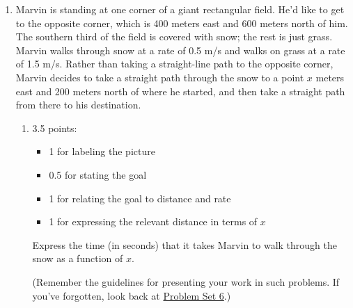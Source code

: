 \documentclass{article}
\begin{document}
\begin{enumerate}
\item 
  \begin{minipage}[t]{1.0\linewidth-2in}
    \setlength{\parskip}{8pt}
    Marvin is standing at one corner of a giant rectangular field. He'd like to get to the opposite corner, which is 400 meters east and 600 meters north of him. The southern third of the field is covered with snow; the rest is just grass. Marvin walks through snow at a rate of 0.5 m/s and walks on grass at a rate of 1.5 m/s. Rather than taking a straight-line path to the opposite corner, Marvin decides to take a straight path through the snow to a point $x$ meters east and 200 meters north of where he started, and then take a straight path from there to his destination. 
  \end{minipage}
  \hfill
  \parbox[t]{1.5in}{
    \vspace{0pt}
  }    


  \pspace{\newpage}

  \begin{enumerate}
  \item
    \begin{grading}
      3.5 points:
      \begin{itemize}[nosep]
      \item 1 for labeling the picture
      \item 0.5 for stating the goal
      \item 1 for relating the goal to distance and rate
      \item 1 for expressing the relevant distance in terms of $x$
      \end{itemize}
    \end{grading}

    \begin{problem}[\vfill]
      Express the time (in seconds) that it takes Marvin to walk through the snow as a function of $x$. 

      (Remember the guidelines for presenting your work in such problems. If you've forgotten, look back at \href{https://canvas.harvard.edu/files/20704944/download?download_frd=1}{Problem Set 6}.)
    \end{problem}


\end{enumerate}
\end{enumerate}
\end{document}
